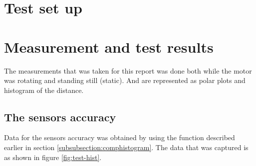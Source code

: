 
\section{Test set up}\label{section:testSetUp}


\section{Measurement and test results}\label{secition:results}
The measurements that was taken for this report was done both while the motor was rotating and standing still (static). And are represented as polar plots and histogram of the distance. 



\subsection{The sensors accuracy}\label{subsubsection:accuracy}
Data for the sensors accuracy was obtained by using the function described earlier in section \ref{subsubsection:comphistogram}. The data that was captured is as shown in figure \ref{fig:test-hist}.

